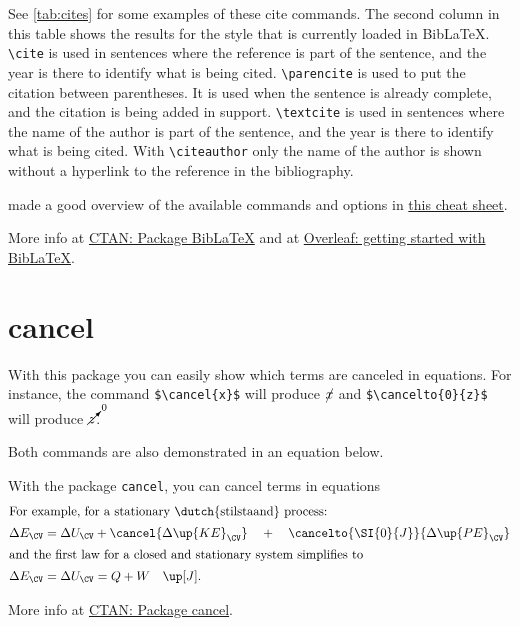 See \cref{tab:cites} for some examples of these cite commands. The second column in this table shows the results for the style that is currently loaded in BibLaTeX. \verb|\cite| is used in sentences where the reference is part of the sentence, and the year is there to identify what is being cited. \verb|\parencite| is used to put the citation between parentheses. It is used when the sentence is already complete, and the citation is being added in support. \verb|\textcite| is used in sentences where the name of the author is part of the sentence, and the year is there to identify what is being cited. With \verb|\citeauthor| only the name of the author is shown without a hyperlink to the reference in the bibliography. 

\textcite{Rees2017} made a good overview of the available commands and options in  \href{https://tug.ctan.org/info/biblatex-cheatsheet/biblatex-cheatsheet.pdf}{this cheat sheet}.

More info at \href{https://ctan.org/pkg/biblatex?lang=en}{CTAN: Package BibLaTeX} and at \href{https://www.overleaf.com/learn/latex/Articles/Getting_started_with_BibLaTeX}{Overleaf: getting started with BibLaTeX}.

\section{cancel}\label{sec:cancel}
With this package you can easily show which terms are canceled in equations. For instance, the command \verb|$\cancel{x}$| will produce $\cancel{x}$ and \verb|$\cancelto{0}{z}$| will produce $\cancelto{0}{z}$.

Both commands are also demonstrated in an equation below.
\begin{frame}{With the package \texttt{cancel}, you can cancel terms in equations}
    \begin{align}
    \intertext{For example, for a stationary \dutch{stilstaand} process:}
    &\Delta E_\CV=\Delta U_\CV + \cancel{\Delta\up{KE}_\CV}\quad +\quad\cancelto{\SI{0}{J}}{\Delta\up{PE}_\CV} \\
    \intertext{and the first law for a closed and stationary system simplifies to}
    &\Delta E_\CV=\Delta U_\CV =Q+W\units{J}.
    \end{align}
\end{frame}

More info at \href{https://ctan.org/pkg/cancel?lang=en}{CTAN: Package cancel}.

